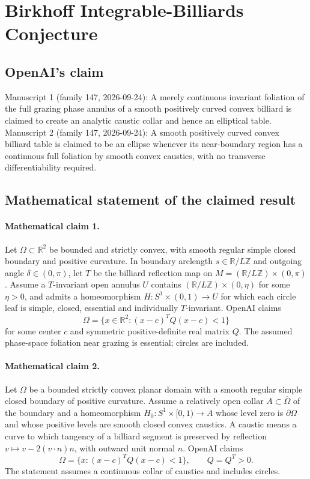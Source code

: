 \documentclass[11pt]{article}
\begin{document}
\section*{Birkhoff Integrable-Billiards Conjecture}

\subsection{OpenAI's claim}
Manuscript 1 (family 147, 2026-09-24): A merely continuous invariant foliation of the full grazing phase annulus of a smooth positively curved convex billiard is claimed to create an analytic caustic collar and hence an elliptical table. Manuscript 2 (family 147, 2026-09-24): A smooth positively curved convex billiard table is claimed to be an ellipse whenever its near-boundary region has a continuous full foliation by smooth convex caustics, with no transverse differentiability required.

\subsection{Mathematical statement of the claimed result}
\paragraph{Mathematical claim 1.} Let $\Omega\subset\mathbb R^2$ be bounded and strictly convex, with smooth regular simple closed boundary and positive curvature. In boundary arclength $s\in\mathbb R/L\mathbb Z$ and outgoing angle $\delta\in(0,\pi)$, let $T$ be the billiard reflection map on $M=(\mathbb R/L\mathbb Z)\times(0,\pi)$. Assume a $T$-invariant open annulus $U$ contains $(\mathbb R/L\mathbb Z)\times(0,\eta)$ for some $\eta>0$, and admits a homeomorphism $H:S^1\times(0,1)\to U$ for which each circle leaf is simple, closed, essential and individually $T$-invariant. OpenAI claims
\[
\Omega=\{x\in\mathbb R^2:(x-c)^TQ(x-c)<1\}
\]
for some center $c$ and symmetric positive-definite real matrix $Q$. The assumed phase-space foliation near grazing is essential; circles are included.

\paragraph{Mathematical claim 2.} Let $\Omega$ be a bounded strictly convex planar domain with a smooth regular simple closed boundary of positive curvature. Assume a relatively open collar $A\subset\overline\Omega$ of the boundary and a homeomorphism $H_0:S^1\times[0,1)\to A$ whose level zero is $\partial\Omega$ and whose positive levels are smooth closed convex caustics. A caustic means a curve to which tangency of a billiard segment is preserved by reflection $v\mapsto v-2(v\cdot n)n$, with outward unit normal $n$. OpenAI claims
\[
\Omega=\{x:(x-c)^TQ(x-c)<1\},\qquad Q=Q^T>0.
\]
The statement assumes a continuous collar of caustics and includes circles.
\end{document}
